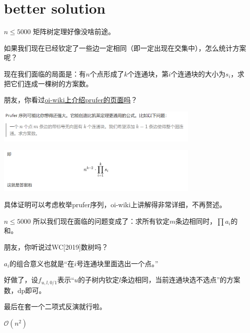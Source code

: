 \section{better solution}
\begin{frame}{$n \le 5000$}
	矩阵树定理好像没啥前途。\pause

	如果我们现在已经钦定了一些边一定相同（即一定出现在交集中），怎么统计方案呢？

	现在我们面临的局面是：有$n$个点形成了$k$个连通块，第$i$个连通块的大小为$s_i$，求把它们连成一棵树的方案数。\pause

	朋友，你看过\href{https://oi-wiki.org/graph/prufer/}{oi-wiki上介绍prufer的页面吗}？

	\begin{center}
		\includegraphics[width=10cm]{prufer-query.png}

		\includegraphics[width=10cm]{prufer-answer.png}
	\end{center}
	\pause

	具体证明可以考虑枚举prufer序列，oi-wiki上讲解得非常详细，不再赘述。
\end{frame}
\begin{frame}{$n \le 5000$}
	所以我们现在面临的问题变成了：求所有钦定$m$条边相同时，$\prod a_i$的和。
	\pause
	
	朋友，你听说过WC[2019]数树吗？

	$a_i$的组合意义也就是“在$i$号连通块里面选出一个点。”
	\pause

	好做了，设$f_{u,l,0/1}$表示“$u$的子树内钦定$l$条边相同，当前连通块选不选点”的方案数，dp即可。

	最后在套一个二项式反演就行啦。\pause

	$\mathcal O(n^2)$
\end{frame}